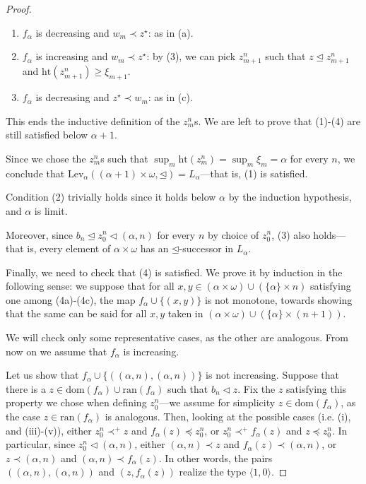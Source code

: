 \documentclass[12pt]{amsart}
\theoremstyle{definition}
\theoremstyle{remark}
\begin{document}
\begin{proof}
\begin{enumerate}[label={(\alph*)}]
\item $f_\alpha$ is decreasing and $w_m \prec z^\star$:
\newline as in (a).

\item $f_\alpha$ is increasing and $w_m \prec z^\star$:
\newline by (3), we can pick $z_{m+1}^n$ such that $z \unlhd z_{m+1}^n$ and $\mathrm{ht}(z_{m+1}^n) \ge \xi_{m+1}$.


\item $f_\alpha$ is decreasing and $z^\star \prec w_m$:
\newline as in (c).
\end{enumerate}


This ends the inductive definition of the $z_m^n$s. We are left to prove that (1)-(4) are still satisfied below $\alpha+1$. 

Since we chose the $z_m^n$s such that $\sup_m \mathrm{ht}(z_m^n) = \sup_m \xi_m = \alpha$ for every $n$, we conclude that $\mathrm{Lev}_\alpha((\alpha+1)\times \omega, \unlhd) = L_\alpha$---that is, (1) is satisfied. 

Condition (2) trivially holds since it holds below $\alpha$ by the induction hypothesis, and $\alpha$ is limit.

Moreover, since $b_n \unlhd z_0^n \lhd (\alpha, n)$ for every $n$ by choice of $z_0^n$, (3) also holds---that is, every element of $\alpha\times \omega$ has an $\unlhd$-successor in $L_\alpha$.  


Finally, we need to check that (4) is satisfied. We prove it by induction in the following sense: we suppose that for all $x,y \in (\alpha \times \omega) \cup (\{\alpha\} \times n)$ satisfying one among (4a)-(4c), the map $f_\alpha \cup \{(x,y)\}$ is not monotone, towards showing that the same can be said for all $x,y$ taken in $(\alpha \times \omega) \cup (\{\alpha\} \times (n+1))$.

We will check only some representative cases, as the other are analogous. From now on we assume that $f_\alpha$ is increasing.

Let us show that $f_\alpha \cup \{((\alpha, n), (\alpha, n))\}$ is not increasing.  Suppose that there is a $z \in \mathrm{dom}(f_\alpha) \cup \mathrm{ran}(f_\alpha)$ such that  $b_n \lhd z$. Fix the $z$ satisfying this property we chose when defining $z_0^n$---we assume for simplicity $z \in \mathrm{dom}(f_\alpha)$, as the case $z \in \mathrm{ran}(f_\alpha)$ is analogous. Then, looking at the possible cases (i.e. (i), and (iii)-(v)), either $z_0^n \prec^+ z$ and $f_\alpha(z) \preceq z_0^n$, or $z_0^n \prec^+ f_\alpha(z)$ and $z \preceq z_0^n$. In particular, since $z_0^n \lhd (\alpha, n)$, either $(\alpha, n) \prec z$ and $f_\alpha(z) \prec (\alpha, n)$, or $z \prec (\alpha, n)$ and $(\alpha, n) \prec f_\alpha(z)$. In other words, the pairs $((\alpha, n), (\alpha, n))$ and $(z, f_\alpha(z))$ realize the type $\langle 1,0\rangle$. 


\end{proof}
\end{document}
